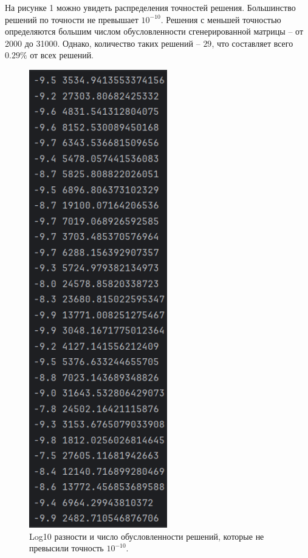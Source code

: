 На рисунке 1 можно увидеть распределения точностей решения. Большинство решений по точности не превышает $10^{-10}$. Решения с меньшей точностью определяются большим числом обусловленности сгенерированной матрицы -- от 2000 до 31000. Однако, количество таких решений -- $29$, что составляет всего $0.29 \% $ от всех решений.

\begin{figure}[H]
    \centering
    \includegraphics[width=6cm]{pictures/BigConditions.png}
    \caption{Log10 разности и число обусловленности решений, которые не превысили точность $10^{-10}$.}
\end{figure}